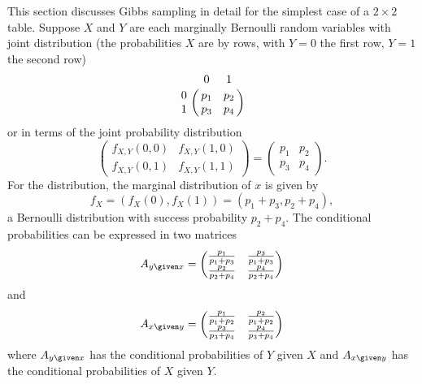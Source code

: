 \documentclass[12pt]{article}
\begin{document}
This section discusses Gibbs sampling in detail for the simplest case of
a \( 2 \times 2 \) table.  Suppose \( X \) and \( Y \) are each
marginally Bernoulli random variables with joint distribution (the
probabilities \( X \) are by rows, with \( Y=0 \) the first row, \( Y=1 \)
the second row)
\[
    \bordermatrix{ & 0 & 1 \cr
    0 & p_1 & p_2 \cr
    1 & p_3 & p_4}
\] or in terms of the joint probability distribution
\[
    \begin{pmatrix}
        f_{X,Y}(0,0) & f_{X,Y}(1,0) \\
        f_{X,Y}(0,1) & f_{X,Y}(1,1)
    \end{pmatrix}
    =
    \begin{pmatrix}
        p_1 & p_2 \\
        p_3 & p_4
    \end{pmatrix}
    .
\] For the distribution, the marginal distribution of \( x \) is given
by
\[
    f_X = (f_X(0), f_X(1)) = (p_1 + p_3, p_2 + p_4),
\] a Bernoulli distribution with success probability \( p_2 + p_4 \).
The conditional probabilities can be expressed in two matrices
\[
    A_{y \given x} =
    \begin{pmatrix}
        \frac{p_1}{p_1 + p_3} & \frac{p_3}{p_1 + p_3} \\
        \frac{p_2}{p_2 + p_4} & \frac{p_4}{p_2 + p_4}
    \end{pmatrix}
\] and
\[
    A_{x \given y} =
    \begin{pmatrix}
        \frac{p_1}{p_1 + p_2} & \frac{p_2}{p_1 + p_2} \\
        \frac{p_3}{p_3 + p_4} & \frac{p_4}{p_3 + p_4}
    \end{pmatrix}
\] where \( A_{y \given x} \) has the conditional probabilities of \( Y \)
given \( X \) and \( A_{x \given y} \) has the conditional probabilities
of \( X \) given \( Y \).
\end{document}
